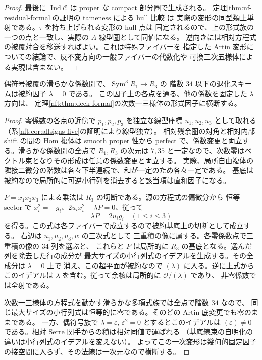 \begin{proof}
最後に $\operatorname{Ind}\mathcal C$ は proper な compact 部分圏で生成される。
定理\ref{thm:nf-residual-formal}の証明の tameness による hull 比較
\cite[Theorems~5.1.9, 5.3.16, Proposition~5.3.21]{NFDAGX}は
実際の変形の同型類上単射である。$\tau$ を持ち上げられる変形の hull 点は
固定されるので、上の形式族の一つの点と一致し、実際の $A$ 線型圏として同値になる。
逆向きには相対方程式の被覆対合を移送すればよい。これは特殊ファイバーを
指定した Artin 変形についての結論で、反不変方向の一般ファイバーの代数化や
可換三次五様体による実現は含まない。
\end{proof}

\begin{corollary}[偶符号族の三重積の退化因子]\label{nft:cor:reduced-product-divisor}
偶符号被覆の滑らかな係数開で、$\operatorname{Sym}^3 R_1\to R_3$ の
階数 $34$ 以下の退化スキームは被約因子 $\lambda=0$ である。
この因子上の各点を通る、他の係数を固定した $\lambda$ 方向は、
定理\ref{nft:thm:deck-formal}の次数一三様体の形式因子に横断する。
\end{corollary}
\begin{proof}
零係数の各点の近傍で $p_1,p_2,p_3$ を独立な線型座標 $u_1,u_2,u_3$ として取れる
（系\ref{nft:cor:allsigns-five}の証明により線型独立）。
相対残余圏の対角と相対内部 shift の間の Hom 複体は smooth proper 性から
perfect で、係数変更と両立する。滑らかな係数開の全点で $R_1,R_3$ の次元は
$7,35$ と一定なので、次数零はベクトル束となりその形成は任意の係数変更と両立する。
実際、局所自由複体の隣接二微分の階数は各々下半連続で、和が一定のため各々一定である。
基底は被約なので局所的に可逆小行列を消去すると該当項は直和因子になる。

$P=x_1x_2x_3$ による乗法は $R_3$ の切断である。源の方程式の偏微分から
恒等 sector で $x_i^2=-g_i$、$2u_ix_i^2+\lambda P=0$、従って
\[
                  \lambda P=2u_i g_i\quad (1\le i\le3)
\]
を得る。この式は各ファイバーで成立するので被約基底上の切断として成立する。
右辺は $u_1,u_2,u_3,w$ の三次式として
三重積の像に属する。各零係数点で三重積の像の $34$ 列を選ぶと、
これらと $P$ は局所的に $R_3$ の基底となる。選んだ列を除去した行の成分が
最大サイズの小行列式のイデアルを生成する。その全成分は $\lambda=0$ 上で
消え、この超平面が被約なので $(\lambda)$ に入る。逆に上式からこのイデアルは
$\lambda$ を含む。従って余核は局所的に $\mathcal O/(\lambda)$ であり、
非零係数では全射である。

次数一三様体の方程式を動かす滑らかな多項式族では全点で階数 $34$ なので、
同じ最大サイズの小行列式は恒等的に零である。そのどの Artin 底変更でも零のままである。
一方、偶符号族で $\lambda=\varepsilon$, $\varepsilon^2=0$ とするとこのイデアルは
$(\varepsilon)\ne0$ である。相対 Serre 関手からの積は相対同値で運ばれる
（基底線束の自明化の違いは小行列式のイデアルを変えない）。
よってこの一次変形は幾何的固定因子の接空間に入らず、その法線は一次元なので横断する。
\end{proof}
